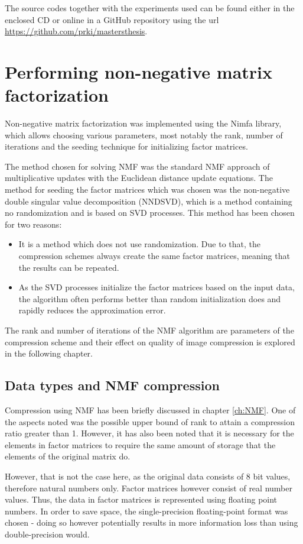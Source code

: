 \documentclass[thesis=M,english]{FITthesis}[2012/10/20]
\begin{document}
The source codes together with the experiments used can be found either in the enclosed
CD or online in a GitHub repository using the url \url{https://github.com/prki/mastersthesis}.

\section{Performing non-negative matrix factorization}
Non-negative matrix factorization was implemented using the Nimfa library, which
allows choosing various parameters, most notably the rank, number of iterations and
the seeding technique for initializing factor matrices.

The method chosen for solving NMF was the standard NMF approach of multiplicative
updates with the Euclidean distance update equations. The method for seeding
the factor matrices which was chosen was the non-negative double singular value
decomposition (NNDSVD)\cite{nndsvd}, which is a method containing no randomization
and is based on SVD processes. This method has been chosen for two reasons:
\begin{itemize}
  \item It is a method which does not use randomization. Due to that, the
  compression schemes always create the same factor matrices, meaning that the
  results can be repeated.
  \item As the SVD processes initialize the factor matrices based on the input
  data, the algorithm often performs better than random initialization does
  and rapidly reduces the approximation error.\cite{nndsvd}
\end{itemize}

The rank and number of iterations of the NMF algorithm are parameters of the
compression scheme and their effect on quality of image compression is explored
in the following chapter.


\subsection{Data types and NMF compression}
Compression using NMF has been briefly discussed in chapter \ref{ch:NMF}. One of
the aspects noted was the possible upper bound of rank to attain a compression ratio
greater than 1. However, it has also been noted that it is necessary for the elements
in factor matrices to require the same amount of storage that the elements of the
original matrix do.

However, that is not the case here, as the original data consists of 8 bit values,
therefore natural numbers only. Factor matrices however consist of real number
values. Thus, the data in factor matrices is represented using floating point
numbers. In order to save space, the single-precision floating-point format was
chosen - doing so however potentially results in more information loss than
using double-precision would.
\end{document}
